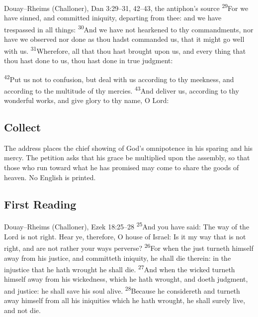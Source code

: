 \begin{englishwitness}{Douay--Rheims (Challoner), Dan 3:29--31, 42--43, the antiphon's source}
\textsuperscript{29}For we have sinned, and committed iniquity, departing from
thee: and we have trespassed in all things: \textsuperscript{30}And we have not
hearkened to thy commandments, nor have we observed nor done as thou hadst
commanded us, that it might go well with us. \textsuperscript{31}Wherefore, all
that thou hast brought upon us, and every thing that thou hast done to us, thou
hast done in true judgment:

\textsuperscript{42}Put us not to confusion, but deal with us according to thy
meekness, and according to the multitude of thy mercies. \textsuperscript{43}And
deliver us, according to thy wonderful works, and give glory to thy name, O
Lord:
\end{englishwitness}

\subsection{Collect}
\label{proper-collect}


\noindent The address places the chief showing of God's omnipotence in his
sparing and his mercy. The petition asks that his grace be multiplied upon the
assembly, so that those who run toward what he has promised may come to share
the goods of heaven. No English is printed.

\subsection{First Reading}
\label{proper-first-reading}


\begin{englishwitness}{Douay--Rheims (Challoner), Ezek 18:25--28}
\textsuperscript{25}And you have said: The way of the Lord is not right. Hear
ye, therefore, O house of Israel: Is it my way that is not right, and are not
rather your ways perverse? \textsuperscript{26}For when the just turneth himself
away from his justice, and committeth iniquity, he shall die therein: in the
injustice that he hath wrought he shall die. \textsuperscript{27}And when the
wicked turneth himself away from his wickedness, which he hath wrought, and
doeth judgment, and justice: he shall save his soul alive.
\textsuperscript{28}Because he considereth and turneth away himself from all
his iniquities which he hath wrought, he shall surely live, and not die.
\end{englishwitness}

